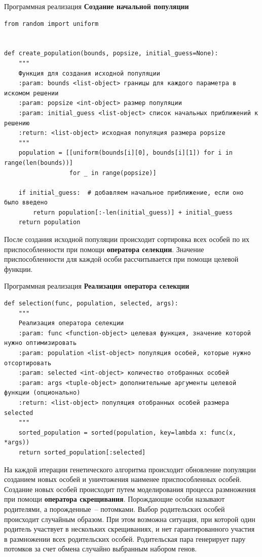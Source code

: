 \documentclass[aspectratio=169, mathserif]{beamer}	%
\begin{document}
\begin{frame}[fragile]{Программная реализация}
\scriptsize
\alert{\textbf{Создание начальной популяции}}
\begin{verbatim}
from random import uniform


def create_population(bounds, popsize, initial_guess=None):
    """
    Функция для создания исходной популяции
    :param: bounds <list-object> границы для каждого параметра в искомом решении
    :param: popsize <int-object> размер популяции
    :param: initial_guess <list-object> список начальных приближений к решению
    :return: <list-object> исходная популяция размера popsize
    """
    population = [[uniform(bounds[i][0], bounds[i][1]) for i in range(len(bounds))]
                  for _ in range(popsize)]

    if initial_guess:  # добавляем начальное приближение, если оно было введено
        return population[:-len(initial_guess)] + initial_guess
    return population
\end{verbatim}

После создания исходной популяции происходит сортировка всех особей по их приспособленности при помощи \textbf{оператора селекции}. Значение приспособленности для каждой особи рассчитывается при помощи целевой функции.
\vfill
\end{frame}

\begin{frame}[fragile]{Программная реализация}
\scriptsize
\alert{\textbf{Реализация оператора селекции}}
\begin{verbatim}
def selection(func, population, selected, args):
    """
    Реализация оператора селекции
    :param: func <function-object> целевая функция, значение которой нужно оптимизировать
    :param: population <list-object> популяция особей, которые нужно отсортировать
    :param: selected <int-object> количество отобранных особей
    :param: args <tuple-object> дополнительные аргументы целевой функции (опционально)
    :return: <list-object> популяция отобранных особей размера selected
    """
    sorted_population = sorted(population, key=lambda x: func(x, *args))
    return sorted_population[:selected]
\end{verbatim}

На каждой итерации генетического алгоритма происходит обновление популяции созданием новых особей и уничтожения наименее приспособленных особей. Создание новых особей происходит путем моделирования процесса размножения при помощи \textbf{оператора скрещивания}. Порождающие особи называют родителями, а порожденные~-- потомками. Выбор родительских особей происходит случайным образом. При этом возможна ситуация, при которой один родитель участвует в нескольких скрещиваниях, и нет гарантированного участия в размножении всех родительских особей. Родительская пара генерирует пару потомков за счет обмена случайно выбранным набором генов.
\vfill
\end{frame}
\end{document}
